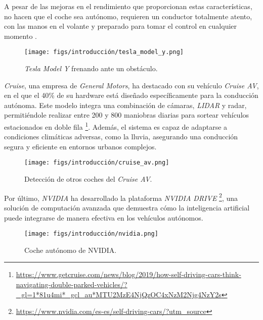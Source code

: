 A pesar de las mejoras en el rendimiento que proporcionan estas características, no hacen que el coche sea autónomo, requieren un conductor totalmente atento, con las manos en el volante y preparado para tomar el control en cualquier momento \cite{tesla-autopilot}.

\begin{figure}[ht]
  \begin{center}
    \texttt{[image: figs/introducción/tesla\_model\_y.png]}
  \end{center}
  \caption{\textit{Tesla Model Y} frenando ante un obstáculo.}
  \label{tesla}
\end{figure}

\textit{Cruise}, una empresa de \textit{General Motors}, ha destacado con su vehículo \textit{Cruise AV}, en el que el 40\% de su hardware está diseñado específicamente para la conducción autónoma. Este modelo integra una combinación de cámaras, \textit{LIDAR} y radar, permitiéndole realizar entre 200 y 800 maniobras diarias para sortear vehículos estacionados en doble fila \footnote{\url{https://www.getcruise.com/news/blog/2019/how-self-driving-cars-think-navigating-double-parked-vehicles/?_gl=1*81u4mi*_gcl_au*MTU2MzE4NjQzOC4xNzM2Njg4NzY2s}}. Además, el sistema es capaz de adaptarse a condiciones climáticas adversas, como la lluvia, asegurando una conducción segura y eficiente en entornos urbanos complejos.

\begin{figure}[ht]
  \begin{center}
    \texttt{[image: figs/introducción/cruise\_av.png]}
  \end{center}
  \caption{Detección de otros coches del \textit{Cruise AV}.}
  \label{cruise}
\end{figure}

Por último, \textit{NVIDIA} ha desarrollado la plataforma \textit{NVIDIA DRIVE} \footnote{\url{https://www.nvidia.com/es-es/self-driving-cars/?utm_source}}, una solución de computación avanzada que demuestra cómo la inteligencia artificial puede integrarse de manera efectiva en los vehículos autónomos.

\begin{figure}[ht]
  \begin{center}
    \texttt{[image: figs/introducción/nvidia.png]}
  \end{center}
  \caption{Coche autónomo de NVIDIA.}
  \label{nvidia}
\end{figure}

